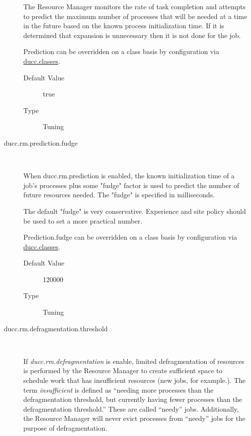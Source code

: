 \begin{description}
          The Resource Manager monitors the rate of task completion and attempts to predict the 
          maximum number of processes that will be needed at a time in the future based on the 
          known process initialization time. If it is determined that expansion is unnecessary then it 
          is not done for the job. 
          
          Prediction can be overridden on a class basis by configuration via
          \hyperref[sec:ducc.classes]{ducc.classes}.
          \begin{description}
            \item[Default Value] true 
            \item[Type] Tuning 
          \end{description}
          

        \item[ducc.rm.prediction.fudge] \hfill \\
          \label{itm:props-rm.prediction.fudge}

          When ducc.rm.prediction is enabled, the known initialization time of a job's processes plus 
          some "fudge" factor is used to predict the number of future resources needed. The "fudge" 
          is specified in milliseconds. 
          
          The default "fudge" is very conservative. Experience and site policy should be used to set a 
          more practical number. 

          Prediction.fudge can be overridden on a class basis by configuration via 
          \hyperref[sec:ducc.classes]{ducc.classes}.

          \begin{description}
          \item[Default Value] 120000
          \item[Type] Tuning 
          \end{description}
                    

        \item[ducc.rm.defragmentation.threshold] \hfill \\
          \label{itm:props-rm.defragmentation.threshold}

          If {\em ducc.rm.defragmentation} is enable, limited defragmentation of resources is
          performed by the Resource Manager to create sufficient space to schedule work 
          that has insufficient resources (new jobs, for example.).  The term
          {\em insufficient} is defined as ``needing more processes than the defragmentation
          threshold, but currently having fewer processes than the defragmentation
          threshold.''  These are called ``needy'' jobs.  Additionally, the Resource Manager
          will never evict processes from ``needy'' jobs for the purpose of defragmentation.


\end{description}
